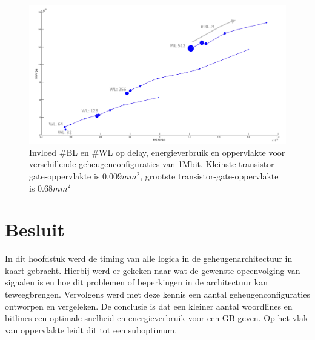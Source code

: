 \begin{figure}[!ht]
  \centering
  \includegraphics[scale=0.6]{../fig/hfdstk-timing-all-sol2.png}
  \caption[Delay, energieverbruik en oppervlakte van alle geheugenconfiguraties]{Invloed \#BL en \#WL op delay, energieverbruik en oppervlakte voor verschillende geheugenconfiguraties van 1Mbit. Kleinste transistor-gate-oppervlakte is $0.009mm^{2}$, grootste transistor-gate-oppervlakte is $0.68mm^{2}$}
  \label{fig:final20all2}
\end{figure} 

\section{Besluit}
In dit hoofdstuk werd de timing van alle logica in de geheugenarchitectuur in kaart gebracht. Hierbij werd er gekeken naar wat de gewenste opeenvolging van signalen is en hoe dit problemen of beperkingen in de architectuur kan teweegbrengen. Vervolgens werd met deze kennis een aantal geheugenconfiguraties ontworpen en vergeleken. De conclusie is dat een kleiner aantal woordlines en bitlines een optimale snelheid en energieverbruik voor een GB geven. Op het vlak van oppervlakte leidt dit tot een suboptimum.
